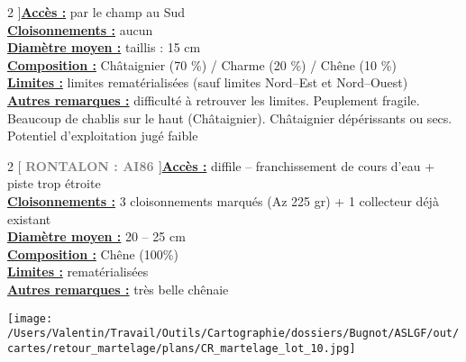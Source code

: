 \documentclass[a4paper,openany]{book}\usepackage[]{graphicx}\usepackage[]{color}
\begin{document}
\begin{multicols}{2}
]\noindent\textbf{\underline{Accès :}} par le champ au Sud\vspace{0.1cm} \\\noindent\textbf{\underline{Cloisonnements :}} aucun\vspace{0.1cm} \\\noindent\textbf{\underline{Diamètre moyen :}} taillis : 15 cm\vspace{0.1cm} \\\noindent\textbf{\underline{Composition :}} Châtaignier (70 \%) / Charme (20 \%) / Chêne (10 \%)\vspace{0.1cm} \\\noindent\textbf{\underline{Limites :}} limites rematérialisées (sauf limites Nord--Est et Nord--Ouest)\vspace{0.1cm} \\\noindent\textbf{\underline{Autres remarques :}} difficulté à retrouver les limites. Peuplement fragile. Beaucoup de chablis sur le haut (Châtaignier). Châtaignier dépérissants ou secs. Potentiel d'exploitation jugé faible\vspace{0.1cm} \\\end{multicols}\begin{multicols}{2}
[
\textbf{\textcolor{gray}{
\large RONTALON : AI86
}}
]\noindent\textbf{\underline{Accès :}} diffile -- franchissement de cours d'eau + piste trop étroite\vspace{0.1cm} \\\noindent\textbf{\underline{Cloisonnements :}} 3 cloisonnements marqués (Az 225 gr) + 1 collecteur déjà existant\vspace{0.1cm} \\\noindent\textbf{\underline{Diamètre moyen :}} 20 -- 25 cm\vspace{0.1cm} \\\noindent\textbf{\underline{Composition :}} Chêne (100\%)\vspace{0.1cm} \\\noindent\textbf{\underline{Limites :}} rematérialisées\vspace{0.1cm} \\\noindent\textbf{\underline{Autres remarques :}} très belle chênaie\vspace{0.1cm} \\\end{multicols}\begin{center}
\texttt{[image: /Users/Valentin/Travail/Outils/Cartographie/dossiers/Bugnot/ASLGF/out/cartes/retour\_martelage/plans/CR\_martelage\_lot\_10.jpg]}
\end{center}\newpage\noindent
\end{document}
